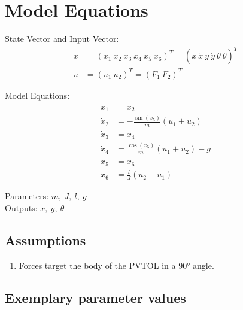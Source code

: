 \documentclass[10pt,a4paper]{article}
\begin{document}
	
	\section{Model Equations} %
	
	State Vector and Input Vector:
	\begin{align*}
		\underline{x} &= (x_1 \ x_2 \ x_3 \ x_4 \ x_5 \ x_6)^T = (x \ \dot{x} \ y \ \dot{y} \ \theta \ \dot{\theta})^T \\
		\underline{u} &= (u_1 \ u_2)^T = (F_1 \ F_2)^T
	\end{align*}

	\noindent Model Equations:	
	\begin{subequations}
	\begin{align}
		\dot{x}_1 &= x_2 	\\ 
		\dot{x}_2 &= -\frac{\sin(x_5)}{m} (u_1 + u_2)  \\
		\dot{x}_3 &= x_4 \\
		\dot{x}_4 &= \frac{\cos(x_5)}{m} (u_1 + u_2) - g \\
		\dot{x}_5 &= x_6 \\
		\dot{x}_6 &= \frac{l}{J} (u_2 - u_1)
	\end{align}
	\end{subequations}

	\noindent
	Parameters: $m, ~J, ~l, ~g$ %
	\\
	Outputs:  $x, ~y, ~\theta$%
	
	
	\subsection{Assumptions} %
		\begin{enumerate} %
			\item Forces target the body of the PVTOL in a 90° angle.
		\end{enumerate}
	
	
	\subsection{Exemplary parameter values}
	
\end{document}
